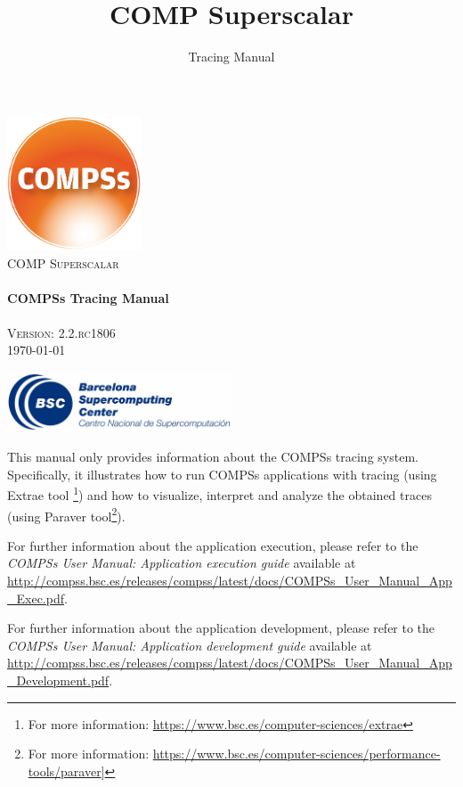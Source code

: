 \documentclass[a4paper,12pt]{article}
\title{COMP Superscalar}
\author{Tracing Manual}
\def \compssversion {2.2.rc1806}
\begin{document}
  \hypersetup{pageanchor=false}
  \begin{titlepage} 
    \begin{center} 
      \includegraphics[width=0.3\textwidth]{./Figures/Logos/degradado-naranja-compss.jpg}~\\[1cm] 
      \textsc{\LARGE COMP Superscalar}\\[1.5cm] 
      
      \HRule \\[0.4cm] 
      { \huge \bfseries COMPSs Tracing Manual \\[0.4cm] }
      \HRule \\[1.5cm] 

      { \large \textsc{Version: \compssversion}} \\[0.3cm]
      { \large \today } 
      
      \vfill 
      \includegraphics[width=0.5\textwidth]{./Figures/bsc_280.jpg}~\\[1cm]
    \end{center} 
  \end{titlepage}
  \hypersetup{pageanchor=true}
  
  {
  
    This manual only provides information about the COMPSs tracing system. Specifically, it illustrates how to run COMPSs applications
    with tracing (using Extrae tool \footnote{For more information: \url{https://www.bsc.es/computer-sciences/extrae}}) and how to visualize, 
    interpret and analyze the obtained traces (using Paraver tool\footnote{For more information: \url{https://www.bsc.es/computer-sciences/performance-tools/paraver}]}).
    \newline

    For further information about the application execution, please refer to the \textit{COMPSs User Manual: Application execution
    guide} available at \url{http://compss.bsc.es/releases/compss/latest/docs/COMPSs_User_Manual_App_Exec.pdf}.
    \newline
    
    For further information about the application development, please refer to the \textit{COMPSs User Manual: Application development
    guide} available at \url{http://compss.bsc.es/releases/compss/latest/docs/COMPSs_User_Manual_App_Development.pdf}.

  }
  
\end{document}
